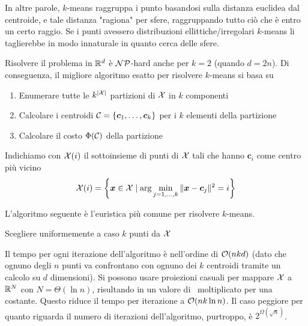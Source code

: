In altre parole, $k$-means raggruppa i punto basandosi sulla distanza euclidea dal centroide, e tale distanza "ragiona" per sfere, raggruppando tutto ciò che è entro un certo raggio. Se i punti avessero distribuzioni ellittiche/irregolari $k$-means li taglierebbe in modo innaturale in quanto cerca delle sfere.

Risolvere il problema in $\mathbb{R}^d$ è $\mathcal{NP}$-hard anche per $k=2$ (quando $d = 2n$). Di conseguenza, il migliore algoritmo esatto per risolvere $k$-means si basa su
\begin{enumerate}
    \item Enumerare tutte le $k^{|\mathcal{X}|}$ partizioni di $\mathcal{X}$ in $k$ componenti

    \item Calcolare i centroidi $\mathcal{C} = \left\{\bm c_1, \dots, \bm c_k\right\}$ per i $k$ elementi della partizione

    \item Calcolare il costo $\Phi (\mathcal{C})$ della partizione
\end{enumerate}

Indichiamo con $\mathcal{X}(i)$ il sottoinsieme di punti di $\mathcal{X}$ tali che hanno $\bm c_i$ come centro più vicino
$$ \mathcal{X}(i) = \left\{\bm x \in \mathcal{X} \mid \arg \min_{j = 1, \dots, k} \|\bm x - \bm c_j \|^2 = i \right\}$$

L'algoritmo seguente è l'euristica più comune per risolvere $k$-means.

\begin{algorithm}
    \label{alg:lloyd}
    \caption{Algoritmo di Lloyd}
    Scegliere uniformemente a caso $k$ punti da $\mathcal{X}$\;
\end{algorithm}

Il tempo per ogni iterazione dell'algoritmo è nell'ordine di $\mathcal{O}(nkd)$ (dato che ognuno degli $n$ punti va confrontano con ognuno dei $k$ centroidi tramite un calcolo su $d$ dimensioni). Si possono usare proiezioni casuali per mappare $\mathcal{X}$ a $\mathbb{R}^N$ con $N = \Theta (\ln n)$, risultando in un valore di \Opt\ moltiplicato per una costante. Questo riduce il tempo per iterazione a $\mathcal{O} (nk \ln n)$. Il caso peggiore per quanto riguarda il numero di iterazioni dell'algoritmo, purtroppo, è $2^{\Omega (\sqrt{n})}$.

